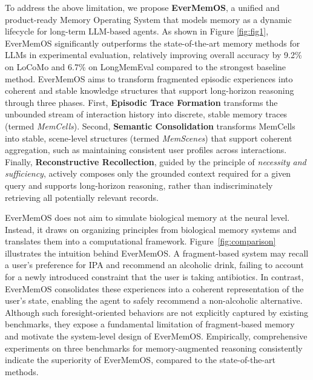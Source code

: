 To address the above limitation, we propose \textbf{EverMemOS}, a unified and product-ready Memory Operating System that models memory as a dynamic lifecycle for long-term LLM-based agents. 
%
As shown in Figure \ref{fig:fig1}, EverMemOS significantly outperforms the state-of-the-art memory methods for LLMs in experimental evaluation, relatively improving overall accuracy by 9.2\% on LoCoMo and 6.7\% on LongMemEval compared to the strongest baseline method.
%
EverMemOS aims to transform fragmented episodic experiences into coherent and stable knowledge structures that support long-horizon reasoning through three phases. First, \textbf{Episodic Trace Formation} transforms the unbounded stream of interaction history into discrete, stable memory traces (termed \textit{MemCells}). Second, \textbf{Semantic Consolidation} transforms MemCells into stable, scene-level structures (termed \textit{MemScenes}) that support coherent aggregation, such as maintaining consistent user profiles across interactions. Finally, \textbf{Reconstructive Recollection}, guided by the principle of \textit{necessity and sufficiency}, actively composes only the grounded context required for a given query and supports long-horizon reasoning, rather than indiscriminately retrieving all potentially relevant records.

EverMemOS does not aim to simulate biological memory at the neural level. Instead, it draws on organizing principles from biological memory systems and translates them into a computational framework. %
Figure~\ref{fig:comparison} illustrates the intuition behind EverMemOS. A fragment-based system may recall a user's preference for IPA and recommend an alcoholic drink, failing to account for a newly introduced constraint that the user is taking antibiotics. In contrast, EverMemOS consolidates these experiences into a coherent representation of the user's state, enabling the agent to safely recommend a non-alcoholic alternative. Although such foresight-oriented behaviors are not explicitly captured by existing benchmarks, they expose a fundamental limitation of fragment-based memory and motivate the system-level design of EverMemOS.
%
Empirically, comprehensive experiments on three benchmarks for memory-augmented reasoning consistently indicate the superiority of EverMemOS, compared to the state-of-the-art methods.

